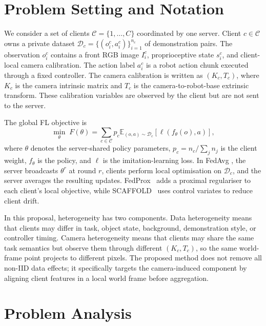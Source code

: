 \documentclass{article}
\begin{document}
\section{Problem Setting and Notation}
\label{sec:setting}

We consider a set of clients $\mathcal{C}=\{1,\ldots,C\}$ coordinated
by one server. Client $c\in\mathcal{C}$ owns a private dataset
$\mathcal{D}_c=\{(o_i^c,a_i^c)\}_{i=1}^{n_c}$ of demonstration
pairs. The observation $o_i^c$ contains a front RGB image
$I_i^c$, proprioceptive state $s_i^c$, and client-local camera
calibration. The action label $a_i^c$ is a robot action chunk
executed through a fixed controller. The camera calibration is
written as $(K_c,T_c)$, where $K_c$ is the camera intrinsic matrix
and $T_c$ is the camera-to-robot-base extrinsic transform. These
calibration variables are observed by the client but are not sent
to the server.

The global FL objective is
\begin{equation}
  \min_{\theta}\; F(\theta)
  = \sum_{c\in\mathcal{C}} p_c
    \mathbb{E}_{(o,a)\sim\mathcal{D}_c}
    \left[\ell(f_{\theta}(o),a)\right],
  \label{eq:fl-objective}
\end{equation}
where $\theta$ denotes the server-shared policy parameters,
$p_c=n_c/\sum_{j}n_j$ is the client weight, $f_{\theta}$ is the
policy, and $\ell$ is the imitation-learning loss. In FedAvg
\cite{fedavg}, the server broadcasts $\theta^r$ at round $r$,
clients perform local optimisation on $\mathcal{D}_c$, and the
server averages the resulting updates. FedProx~\cite{fedprox}
adds a proximal regulariser to each client's local objective, while
SCAFFOLD~\cite{scaffold} uses control variates to reduce client
drift.

In this proposal, heterogeneity has two components. Data
heterogeneity means that clients may differ in task, object state,
background, demonstration style, or controller timing. Camera
heterogeneity means that clients may share the same task semantics
but observe them through different $(K_c,T_c)$, so the same
world-frame point projects to different pixels. The proposed
method does not remove all non-IID data effects; it specifically
targets the camera-induced component by aligning client features in
a local world frame before aggregation.

\section{Problem Analysis}
\label{sec:problem}
\end{document}

